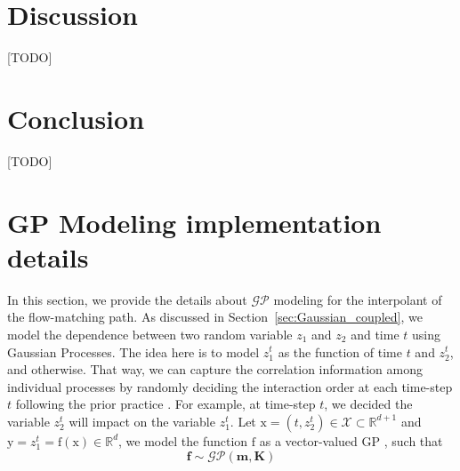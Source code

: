 \documentclass{article}
\begin{document}
\section{Discussion}
[TODO]
\section{Conclusion}
[TODO]


\newpage
\appendix

\section{GP Modeling implementation details}
\label{appendix:GP_details}
In this section, we provide the details about $\mathcal{GP}$ modeling for the interpolant of the flow-matching path. As discussed in Section~\ref{sec:Gaussian_coupled}, we model the dependence between two random variable $z_1$ and $z_2$ and time $t$ using Gaussian Processes. The idea here is to model $z^t_1$ as the function of time $t$ and $z^t_2$, and otherwise. That way, we can capture the correlation information among individual processes by randomly deciding the interaction order at each time-step $t$ following the prior practice \citep{xiao2023coupled}. For example, at time-step $t$, we decided the variable $z^t_2$ will impact on the variable $z^t_1$. Let $\mathrm{x} = (t, z^t_2) \in \mathcal{X} \subset \mathbb{R}^{d+1}$ and $\mathrm{y} = z^t_1 = \mathrm{f}(\mathrm{x}) \in \mathbb{R}^{d}$, we model the function $\mathrm{f}$ as a vector-valued GP \citep{alvarez2012kernelsvectorvaluedfunctionsreview}, such that 
\begin{equation}
   \mathbf{f} \sim \mathcal{GP}(\mathbf{m}, \mathbf{K})
\end{equation}
\end{document}
